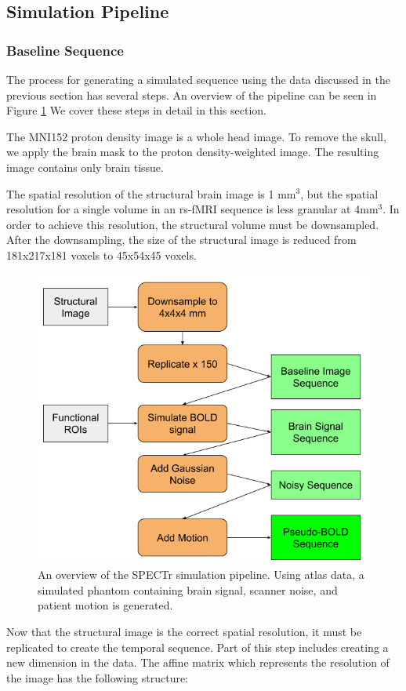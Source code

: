 \subsection{Simulation Pipeline}

\subsubsection{Baseline Sequence}

The process for generating a simulated sequence using the data discussed in the previous section has several steps. An overview of the pipeline can be seen in Figure \ref{ch5:spectr_flow} We cover these steps in detail in this section.

The MNI152 proton density image is a whole head image. To remove the skull, we apply the brain mask to the proton density-weighted image. The resulting image contains only brain tissue.

The spatial resolution of the structural brain image is 1 mm$^3$, but the spatial resolution for a single volume in an rs-fMRI sequence is less granular at 4mm$^3$. In order to achieve this resolution, the structural volume must be downsampled. After the downsampling, the size of the structural image is reduced from 181x217x181 voxels to 45x54x45 voxels. 

\begin{figure}[t]
\centering
\includegraphics[width=.5\textwidth]{5/pipeline.png}
\caption{An overview of the SPECTr simulation pipeline. Using atlas data, a simulated phantom containing brain signal, scanner noise, and patient motion is generated.}
\label{ch5:spectr_flow}
\vspace{20pt}
\end{figure}


Now that the structural image is the correct spatial resolution, it must be replicated to create the temporal sequence. Part of this step includes creating a new dimension in the data. The affine matrix which represents the resolution of the image has the following structure:

